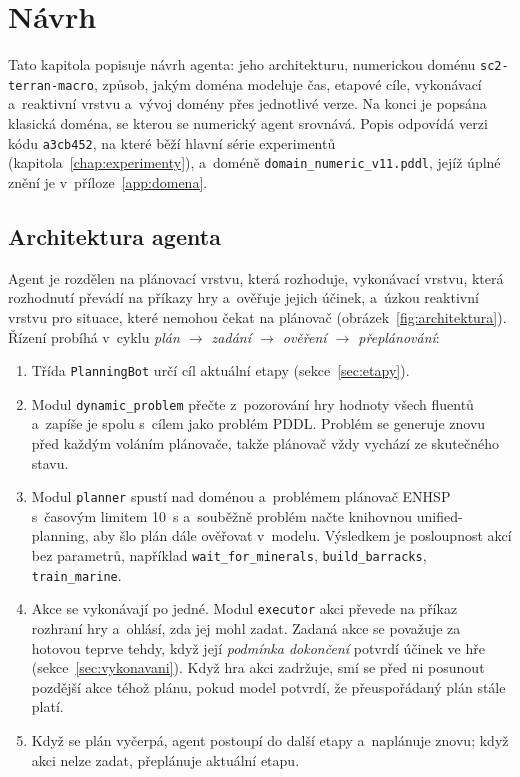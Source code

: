 \chapter{Návrh}
\label{chap:navrh}

Tato kapitola popisuje návrh agenta: jeho architekturu, numerickou doménu \texttt{sc2-terran-macro}, způsob, jakým doména modeluje čas, etapové cíle, vykonávací a~reaktivní vrstvu a~vývoj domény přes jednotlivé verze. Na konci je popsána klasická doména, se kterou se numerický agent srovnává. Popis odpovídá verzi kódu \texttt{a3cb452}, na které běží hlavní série experimentů (kapitola~\ref{chap:experimenty}), a~doméně \texttt{domain\_numeric\_v11.pddl}, jejíž úplné znění je v~příloze~\ref{app:domena}.

\section{Architektura agenta}
\label{sec:architektura}

Agent je rozdělen na plánovací vrstvu, která rozhoduje, vykonávací vrstvu, která rozhodnutí převádí na příkazy hry a~ověřuje jejich účinek, a~úzkou reaktivní vrstvu pro situace, které nemohou čekat na plánovač (obrázek~\ref{fig:architektura}). Řízení probíhá v~cyklu \emph{plán $\to$ zadání $\to$ ověření $\to$ přeplánování}:

\begin{enumerate}
	\item Třída \texttt{PlanningBot} určí cíl aktuální etapy (sekce~\ref{sec:etapy}).
	\item Modul \texttt{dynamic\_problem} přečte z~pozorování hry hodnoty všech fluentů a~zapíše je spolu s~cílem jako problém PDDL. Problém se generuje znovu před každým voláním plánovače, takže plánovač vždy vychází ze skutečného stavu.
	\item Modul \texttt{planner} spustí nad doménou a~problémem plánovač ENHSP s~časovým limitem 10~s a~souběžně problém načte knihovnou unified-planning, aby šlo plán dále ověřovat v~modelu. Výsledkem je posloupnost akcí bez parametrů, například \texttt{wait\_for\_minerals}, \texttt{build\_barracks}, \texttt{train\_marine}.
	\item Akce se vykonávají po jedné. Modul \texttt{executor} akci převede na příkaz rozhraní hry a~ohlásí, zda jej mohl zadat. Zadaná akce se považuje za hotovou teprve tehdy, když její \emph{podmínka dokončení} potvrdí účinek ve hře (sekce~\ref{sec:vykonavani}). Když hra akci zadržuje, smí se před ni posunout pozdější akce téhož plánu, pokud model potvrdí, že přeuspořádaný plán stále platí.
	\item Když se plán vyčerpá, agent postoupí do další etapy a~naplánuje znovu; když akci nelze zadat, přeplánuje aktuální etapu.
\end{enumerate}

